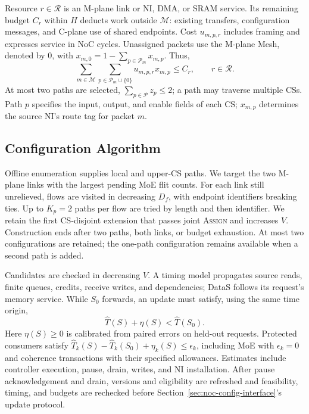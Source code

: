 Resource $r\in\mathcal R$ is an M-plane link or NI, DMA, or SRAM service.
Its remaining budget $C_r$ within $H$ deducts work outside $\mathcal M$:
existing transfers, configuration messages, and C-plane use of shared endpoints.
Cost $u_{m,p,r}$ includes framing and expresses service in NoC cycles.
Unassigned packets use the M-plane Mesh, denoted
by 0, with $x_{m,0}=1-\sum_{p\in\mathcal P_m}x_{m,p}$. Thus,
\begin{equation}
  \sum_{m\in\mathcal M}\sum_{p\in\mathcal P_m\cup\{0\}}
  u_{m,p,r}x_{m,p}\leq C_r,\qquad r\in\mathcal R.
  \label{eq:noc-resource-capacity}
\end{equation}
At most two paths are selected, $\sum_{p\in\mathcal P}z_p\leq2$;
a path may traverse multiple CSs.
Path $p$ specifies the input, output, and enable fields of each CS;
$x_{m,p}$ determines the source NI's route tag for packet $m$.

\subsection{Configuration Algorithm}
\label{sec:noc-algorithm}

Offline enumeration supplies local and upper-CS paths. We target the two
M-plane links with the largest pending MoE flit counts. For each link
still unrelieved, flows are visited in decreasing $D_f$, with endpoint
identifiers breaking ties. Up to $K_p=2$ paths per flow are tried by length
and then identifier. We retain the first CS-disjoint extension that passes
joint \textsc{Assign} and increases $V$. Construction ends after two paths,
both links, or budget exhaustion. At most two configurations are retained;
the one-path configuration remains available when a second path is added.

Candidates are checked in decreasing $V$. A timing model propagates
source reads, finite queues, credits, receive writes, and dependencies;
DataS follows its request's memory service. While $S_0$ forwards, an update
must satisfy, using the same time origin,
\begin{equation}
  \widehat T(S)+\eta(S)<\widehat T(S_0).
  \label{eq:noc-switching-check}
\end{equation}
Here $\eta(S)\geq0$ is calibrated from paired errors on held-out requests.
Protected consumers satisfy
$\widehat T_k(S)-\widehat T_k(S_0)+\eta_k(S)\leq\epsilon_k$,
including MoE with $\epsilon_k=0$ and coherence transactions with their
specified allowances. Estimates include controller execution, pause,
drain, writes, and NI installation. After pause acknowledgement and drain, versions and eligibility are refreshed and feasibility, timing, and budgets are
rechecked before Section~\ref{sec:noc-config-interface}'s update protocol.

